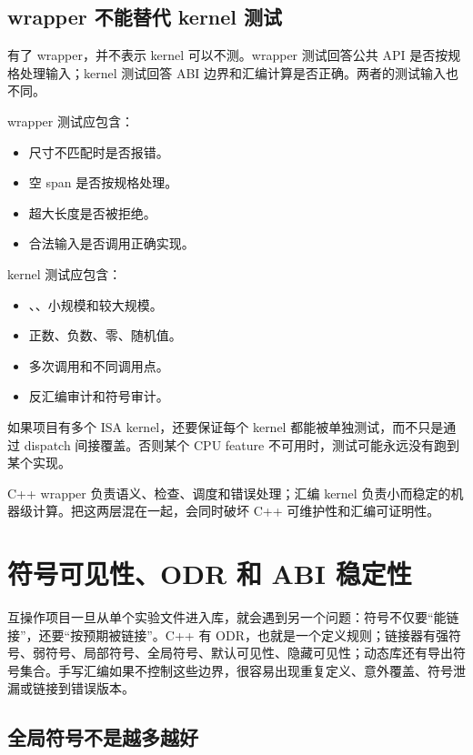 \subsection{wrapper 不能替代 kernel 测试}

有了 wrapper，并不表示 kernel 可以不测。wrapper 测试回答公共 API 是否按规格处理输入；kernel 测试回答 ABI 边界和汇编计算是否正确。两者的测试输入也不同。

wrapper 测试应包含：

\begin{itemize}
  \item 尺寸不匹配时是否报错。
  \item 空 span 是否按规格处理。
  \item 超大长度是否被拒绝。
  \item 合法输入是否调用正确实现。
\end{itemize}

kernel 测试应包含：

\begin{itemize}
  \item {}、、小规模和较大规模。
  \item 正数、负数、零、随机值。
  \item 多次调用和不同调用点。
  \item 反汇编审计和符号审计。
\end{itemize}

如果项目有多个 ISA kernel，还要保证每个 kernel 都能被单独测试，而不只是通过 dispatch 间接覆盖。否则某个 CPU feature 不可用时，测试可能永远没有跑到某个实现。

\begin{keyidea}
C++ wrapper 负责语义、检查、调度和错误处理；汇编 kernel 负责小而稳定的机器级计算。把这两层混在一起，会同时破坏 C++ 可维护性和汇编可证明性。
\end{keyidea}

\section{符号可见性、ODR 和 ABI 稳定性}

互操作项目一旦从单个实验文件进入库，就会遇到另一个问题：符号不仅要“能链接”，还要“按预期被链接”。C++ 有 ODR，也就是一个定义规则；链接器有强符号、弱符号、局部符号、全局符号、默认可见性、隐藏可见性；动态库还有导出符号集合。手写汇编如果不控制这些边界，很容易出现重复定义、意外覆盖、符号泄漏或链接到错误版本。

\subsection{全局符号不是越多越好}

